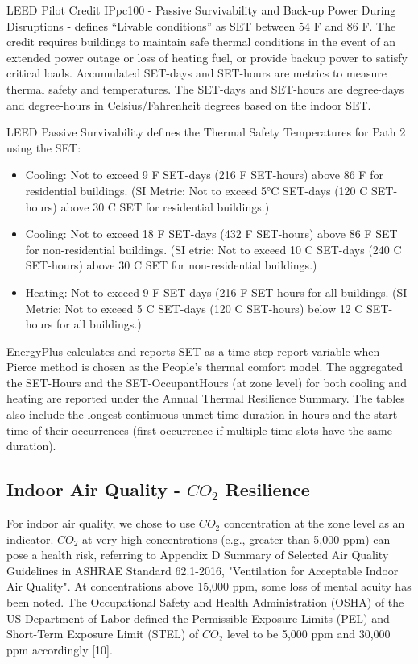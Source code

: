 LEED Pilot Credit IPpc100 - Passive Survivability and Back-up Power During Disruptions - defines “Livable conditions” as SET between 54 \degree F and 86 \degree F. The credit requires buildings to maintain safe thermal conditions in the event of an extended power outage or loss of heating fuel, or provide backup power to satisfy critical loads. Accumulated SET-days and SET-hours are metrics to measure thermal safety and temperatures. The SET-days and SET-hours are degree-days and degree-hours in Celsius/Fahrenheit degrees based on the indoor SET.

LEED Passive Survivability defines the Thermal Safety Temperatures for Path 2 using the SET:

\begin{itemize}
\item Cooling: Not to exceed 9 \degree F SET-days (216 \degree F SET-hours) above 86 \degree F for residential buildings. (SI Metric: Not to exceed 5°C SET-days (120 \degree C SET-hours) above 30 \degree C SET for residential buildings.)
\item Cooling: Not to exceed 18 \degree F SET-days (432 \degree F SET-hours) above 86 \degree F SET for non-residential buildings. (SI etric: Not to exceed 10 \degree C SET-days (240 \degree C SET-hours) above 30 \degree C SET for non-residential buildings.)
\item Heating: Not to exceed 9 \degree F SET-days (216 \degree F SET-hours for all buildings. (SI Metric: Not to exceed 5 \degree C SET-days (120 \degree C SET-hours) below 12 \degree C SET-hours for all buildings.)
\end{itemize}

EnergyPlus calculates and reports SET as a time-step report variable when Pierce method is chosen as the People's thermal comfort model. The aggregated the SET-Hours and the SET-OccupantHours (at zone level) for both cooling and heating are reported under the Annual Thermal Resilience Summary. The tables also include the longest continuous unmet time duration in hours and the start time of their occurrences (first occurrence if multiple time slots have the same duration).


\subsection{Indoor Air Quality - $CO_2$ Resilience}\label{indoor-air-quality-resilience}

For indoor air quality, we chose to use $CO_2$ concentration at the zone level as an indicator. $CO_2$ at very high concentrations (e.g., greater than 5,000 ppm) can pose a health risk, referring to Appendix D Summary of Selected Air Quality Guidelines in ASHRAE Standard 62.1-2016, "Ventilation for Acceptable Indoor Air Quality". At concentrations above 15,000 ppm, some loss of mental acuity has been noted. The Occupational Safety and Health Administration (OSHA) of the US Department of Labor defined the Permissible Exposure Limits (PEL) and Short-Term Exposure Limit (STEL) of $CO_2$ level to be 5,000 ppm and 30,000 ppm accordingly [10].

